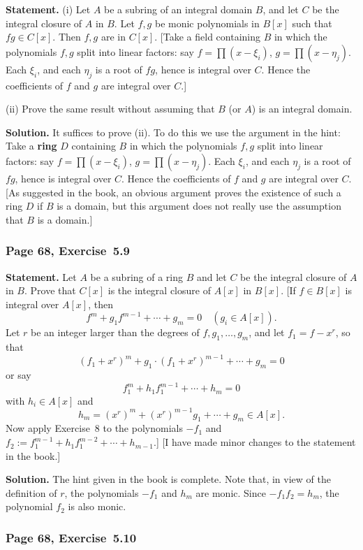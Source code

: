 \documentclass[12pt,letterpaper]{article}%
\newcommand{\nn}{\noindent}
\begin{document}
\textbf{Statement.} (i) Let $A$ be a subring of an integral domain $B$, and let $C$ be the integral closure of $A$ in $B$. Let $f,g$ be monic polynomials in $B[x]$ such that $fg\in C[x]$. Then $f,g$ are in $C[x]$. [Take a field containing $B$ in which the polynomials $f,g$ split into linear factors: say $f=\prod(x-\xi_i)$, $g=\prod(x-\eta_j)$. Each $\xi_i$, and each $\eta_j$ is a root of $fg$, hence is integral over $C$. Hence the coefficients of $f$ and $g$ are integral over $C$.]

\nn(ii) Prove the same result without assuming that $B$ (or $A$) is an integral domain.

\nn\textbf{Solution.} It suffices to prove (ii). To do this we use the argument in the hint: Take a \textbf{ring} $D$ containing $B$ in which the polynomials $f,g$ split into linear factors: say $f=\prod(x-\xi_i)$, $g=\prod(x-\eta_j)$. Each $\xi_i$, and each $\eta_j$ is a root of $fg$, hence is integral over $C$. Hence the coefficients of $f$ and $g$ are integral over $C$. [As suggested in the book, an obvious argument proves the existence of such a ring $D$ if $B$ is a domain, but this argument does not really use the assumption that $B$ is a domain.]

\subsubsection{Page 68, Exercise~5.9}%

\textbf{Statement.} Let $A$ be a subring of a ring $B$ and let $C$ be the integral closure of $A$ in $B$. Prove that $C[x]$ is the integral closure of $A[x]$ in $B[x]$. [If $f\in B[x]$ is integral over $A[x]$, then
$$
f^m+g_1f^{m-1}+\cdots+g_m= 0\quad (g_i\in A[x]).
$$ 
Let $r$ be an integer larger than the degrees of $f,g_1,\ldots,g_m$, and let $f_1=
f-x^r$, so that 
$$
(f_1+x^r)^m+g_1\cdot(f_1+x^r)^{m-1}+\cdots+g_m=0
$$
or say
$$
f_1^m+h_1f_1^{m-1}+\cdots+h_m=0
$$ 
with $h_i\in A[x]$ and 
$$
h_m=(x^r)^m+(x^r)^{m-1}g_1+\cdots+g_m\in A[x].
$$ 
Now apply Exercise~8 to the polynomials $-f_1$ and $f_2:=f_1^{m-1}+h_1f_1^{m-2}+\cdots+h_{m-1}$.] [I have made minor changes to the statement in the book.]

\nn\textbf{Solution.} The hint given in the book is complete. Note that, in view of the definition of $r$, the polynomials $-f_1$ and $h_m$ are monic. Since $-f_1f_2=h_m$, the polynomial $f_2$ is also monic.

\subsubsection{Page 68, Exercise~5.10}\label{ex5.10}%
\end{document}
